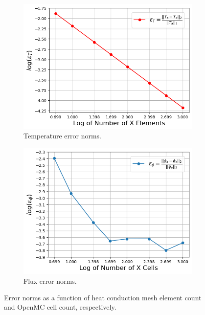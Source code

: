 \documentclass[letterpaper]{mc2023}
\begin{document}
\begin{figure}[H]
    \centering
    \begin{subfigure}{0.395\linewidth}
        \includegraphics[width=\linewidth]{figures/temp_error_norms.png}
        \caption{Temperature error norms.}
        \label{fig:temp_err}
    \end{subfigure}
    \begin{subfigure}{0.395\linewidth}
        \includegraphics[width=\linewidth]{figures/flux_error_norms.png}
        \caption{Flux error norms.}
        \label{fig:flux_err}
    \end{subfigure}
    \par\bigskip
    \caption{Error norms as a function of heat conduction mesh element count and OpenMC cell count, respectively.}
    \label{fig:error_study}
\end{figure}
\end{document}
